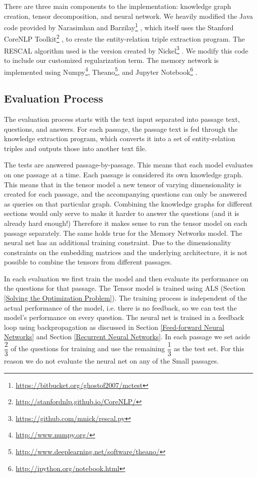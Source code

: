 \documentclass[pageno]{final_paper}
\begin{document}
There are three main components to the implementation: knowledge graph creation,
tensor decomposition, and neural network. We heavily modified the Java code
provided by Narasimhan and
Barzilay\footnote{\url{https://bitbucket.org/ghostof2007/mctest}}
\cite{Narasimhan2015}, which itself uses the Stanford CoreNLP
Toolkit\footnote{\url{http://stanfordnlp.github.io/CoreNLP/}}
\cite{Manning2014}, to create the entity-relation triple extraction program. The
RESCAL algorithm used is the version created by
Nickel\footnote{\url{https://github.com/mnick/rescal.py}} \cite{Nickel2011}. We
modify this code to include our customized regularization term. The memory
network is implemented using Numpy\footnote{\url{http://www.numpy.org/}},
Theano\footnote{\url{http://www.deeplearning.net/software/theano/}}, and Jupyter
Notebook\footnote{\url{http://ipython.org/notebook.html}} \cite{Jones2001,
Perez2007, Bastien2012, Bergstra2010}.

\subsection{Evaluation Process}
\label{Evaluation Process}

The evaluation process starts with the text input separated into passage text,
questions, and answers. For each passage, the passage text is fed through the
knowledge extraction program, which converts it into a set of entity-relation
triples and outputs those into another text file.

The tests are answered passage-by-passage. This means that each model evaluates
on one passage at a time. Each passage is considered its own knowledge graph.
This means that in the tensor model a new tensor of varying dimensionality is
created for each passage, and the accompanying questions can only be answered as
queries on that particular graph. Combining the knowledge graphs for different
sections would only serve to make it harder to answer the questions (and it is
already hard enough!) Therefore it makes sense to run the tensor model on each
passage separately. The same holds true for the Memory Networks model. The
neural net has an additional training constraint. Due to the dimensionality
constraints on the embedding matrices and the underlying architecture, it is
not possible to combine the tensors from different passages.

In each evaluation we first train the model and then evaluate its performance on
the questions for that passage. The Tensor model is trained using ALS (Section
\ref{Solving the Optimization Problem}). The training process is independent of
the actual performance of the model, i.e. there is no feedback, so we can test
the model's performance on every question. The neural net is trained in a
feedback loop using backpropagation as discussed in Section \ref{Feed-forward
Neural Networks} and Section \ref{Recurrent Neural Networks}. In each passage we
set aside $\dfrac{2}{3}$ of the questions for training and use the remaining
$\dfrac{1}{3}$ as the test set. For this reason we do not evaluate the neural
net on any of the Small passages.
\end{document}
